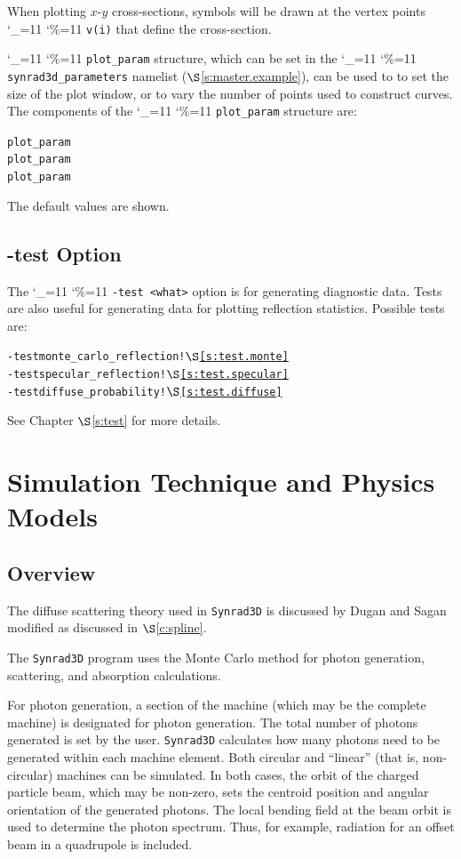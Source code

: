 \documentclass[11pt,openany]{report}
\newcommand{\sref}[1]{$\S$\ref{#1}}
\newcommand{\srthree}{\texttt{Synrad3D}\xspace}
\newcommand\ttcmd{\begingroup\catcode`\_=11 \catcode`\%=11 \dottcmd}
\newcommand\dottcmd[1]{\texttt{#1}\endgroup}
\newcommand{\vn}{\ttcmd}
\newlength{\ExBeg}
\newlength{\ExEnd}
\newenvironment{example}
  {\vspace{\ExBeg} \begin{alltt}}
  {\end{alltt} \vspace{\ExEnd}}
\begin{document}
When plotting $x$-$y$ cross-sections, symbols
will be drawn at the vertex points \vn{v(i)} that define the
cross-section.

\vn{plot_param} structure, which can be set in the \vn{synrad3d_parameters} namelist
(\sref{s:master.example}), can be used to to set the size of the plot window, or to vary the number
of points used to construct curves. The components of the \vn{plot_param} structure are:
\begin{example}
  plot_param%
  plot_param%
  plot_param%
\end{example}
The default values are shown.

\section{-test Option}
\label{s:test.opt}

The \vn{-test <what>} option is for generating diagnostic data. Tests are also useful for generating
data for plotting reflection statistics. Possible tests are:
\begin{example}
  -test monte_carlo_reflection ! \sref{s:test.monte}
  -test specular_reflection    ! \sref{s:test.specular}
  -test diffuse_probability    ! \sref{s:test.diffuse}
\end{example}
See Chapter \sref{s:test} for more details.

\chapter{Simulation Technique and Physics Models}
\section{Overview} 

The diffuse scattering theory used in \srthree is discussed by 
Dugan and Sagan\cite{b:prab} modified as discussed in \sref{c:spline}.

The \srthree program uses the Monte Carlo method for photon
generation, scattering, and absorption calculations.

For photon generation, a section of the machine (which may be the
complete machine) is designated for photon generation.  The total
number of photons generated is set by the user. \srthree calculates
how many photons need to be generated within each machine
element. Both circular and ``linear'' (that is, non-circular) machines
can be simulated.  In both cases, the orbit of the charged particle
beam, which may be non-zero, sets the centroid position and angular
orientation of the generated photons. The local bending field at the
beam orbit is used to determine the photon spectrum. Thus, for
example, radiation for an offset beam in a quadrupole is included.
\end{document}
